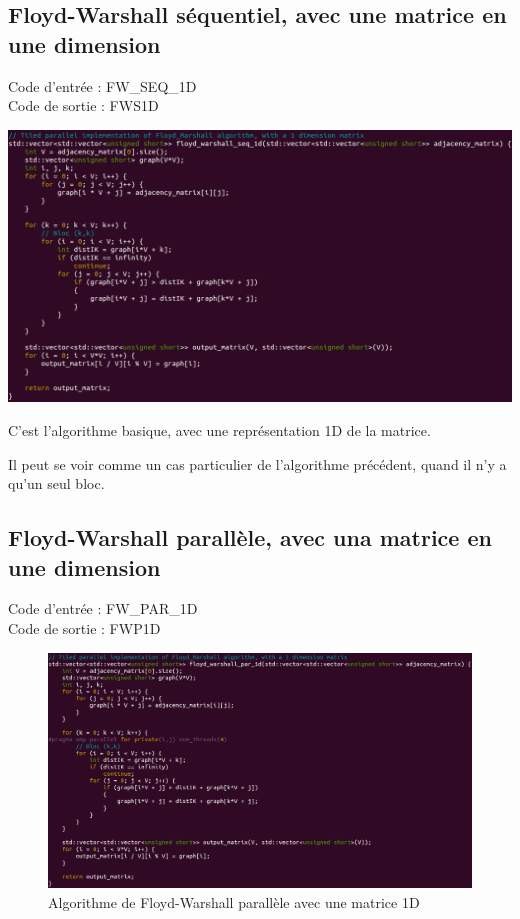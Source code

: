 \documentclass[a4paper,11pt]{article}
\begin{document}
\subsection{Floyd-Warshall séquentiel, avec une matrice en une dimension}

\noindent Code d'entrée : FW\_SEQ\_1D \\
Code de sortie : FWS1D

\begin{center}
  \includegraphics[scale=0.6]{FW_SEQ_1D.png}
\end{center}

C'est l'algorithme basique, avec une représentation 1D de la matrice.

Il peut se voir comme un cas particulier de l'algorithme précédent, quand il n'y a qu'un seul bloc.

\subsection{Floyd-Warshall parallèle, avec una matrice en une dimension}

\noindent Code d'entrée : FW\_PAR\_1D \\
Code de sortie : FWP1D

\begin{figure}[H]
\begin{center}
  \includegraphics[scale=0.6]{FW_PAR_1D.png}
  \caption{Algorithme de Floyd-Warshall parallèle avec une matrice 1D}
\end{center}
\end{figure}
\end{document}
